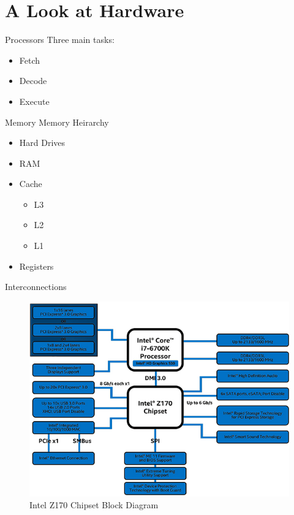 \documentclass[serif,mathserif,compress]{beamer}
\begin{document}
\section{A Look at Hardware}

\begin{frame}{Processors}
  Three main tasks:
  \begin{itemize}
  \item<1-> Fetch 
  \item<1-> Decode 
  \item<1-> Execute 
  \end{itemize}
\end{frame}

\begin{frame}{Memory}
  Memory Heirarchy
  \begin{itemize}
  \item<1-> Hard Drives 
  \item<3-> RAM 
  \item<5-> Cache 
    \begin{itemize}
    \item<7-> L3 
    \item<7-> L2 
    \item<7-> L1 
    \end{itemize}
  \item<9-> Registers
  \end{itemize}
\end{frame}

\begin{frame}{Interconnections}
  \begin{figure}
  \centering
  \includegraphics[height=0.7\textheight]{images/Intel-Z170-chipset-block-diagram.jpg}
  \caption{Intel Z170 Chipset Block Diagram}
  \label{fig:intel-z170-chipset}
  \end{figure}
\end{frame}
\end{document}
